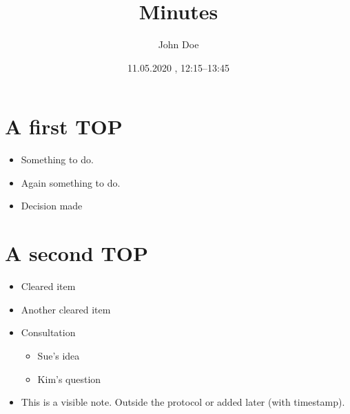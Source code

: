 \documentclass[11pt]{article}
\author{John Doe}
\date{11.05.2020 , 12:15--13:45}
\title{Minutes}
\begin{document}
\maketitle
\tableofcontents


\section{\texorpdfstring{}{}A first TOP}
\label{sec:orgf6bf828}
\begin{itemize}
\item {} Something to do.
\item \ActionTag{}{::} \ActionTagMargin{}Again something to do.
\item \EntscheidungTag{}{::} \EntscheidungTagMargin{ }Decision made
\end{itemize}
\section{A second TOP}
\label{sec:orgab6b0c5}
\begin{itemize}
\item \ClearedTag{}{::} \ClearedTagMargin{ }Cleared item
\item \ClearedTag{}{::} \ClearedTagMargin{ }Another cleared item
\item \ConsultationTag{}{::} \ConsultationTagMargin{ }Consultation 
\begin{itemize}
\item {}Sue's idea
\item {}Kim's question
\end{itemize}
\item \NoteTag{}{::}This is a visible note. Outside the protocol or added later (with timestamp). 
\end{itemize}
\end{document}
